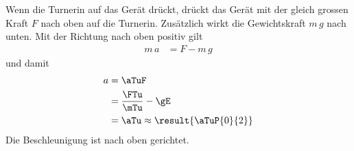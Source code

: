 \begin{center}
\end{center}

Wenn die Turnerin auf das Gerät drückt, drückt das Gerät mit der gleich grossen Kraft $F$ nach oben auf die Turnerin. Zusätzlich wirkt die Gewichtskraft $m\,g$ nach unten. Mit der Richtung nach oben positiv gilt
\begin{align}
 m\,a &= F - m\,g
\end{align}
und damit
\begin{align}
 a &= \aTuF \\
   &= \frac{\FTu}{\mTu}-\gE \\
   &= \aTu \approx \result{\aTuP{0}{2}}
\end{align}
Die Beschleunigung ist nach oben gerichtet.
